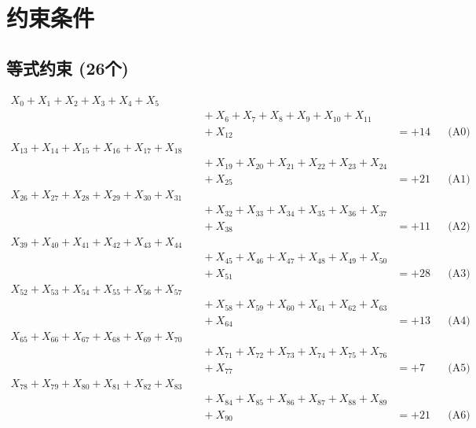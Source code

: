 \documentclass[a4paper,10pt]{article}
\begin{document}
\section{约束条件}

\subsection{等式约束 (26个)}

\allowdisplaybreaks
{\small
\begin{align}
X_{0} + X_{1} + X_{2} + X_{3} + X_{4} + X_{5} \\[0.1ex]
&\quad  + X_{6} + X_{7} + X_{8} + X_{9} + X_{10} + X_{11} \\[0.1ex]
&\quad  + X_{12} &= +14 && \text{(A0)} \\
X_{13} + X_{14} + X_{15} + X_{16} + X_{17} + X_{18} \\[0.1ex]
&\quad  + X_{19} + X_{20} + X_{21} + X_{22} + X_{23} + X_{24} \\[0.1ex]
&\quad  + X_{25} &= +21 && \text{(A1)} \\
X_{26} + X_{27} + X_{28} + X_{29} + X_{30} + X_{31} \\[0.1ex]
&\quad  + X_{32} + X_{33} + X_{34} + X_{35} + X_{36} + X_{37} \\[0.1ex]
&\quad  + X_{38} &= +11 && \text{(A2)} \\
X_{39} + X_{40} + X_{41} + X_{42} + X_{43} + X_{44} \\[0.1ex]
&\quad  + X_{45} + X_{46} + X_{47} + X_{48} + X_{49} + X_{50} \\[0.1ex]
&\quad  + X_{51} &= +28 && \text{(A3)} \\
X_{52} + X_{53} + X_{54} + X_{55} + X_{56} + X_{57} \\[0.1ex]
&\quad  + X_{58} + X_{59} + X_{60} + X_{61} + X_{62} + X_{63} \\[0.1ex]
&\quad  + X_{64} &= +13 && \text{(A4)} \\
\allowbreak
X_{65} + X_{66} + X_{67} + X_{68} + X_{69} + X_{70} \\[0.1ex]
&\quad  + X_{71} + X_{72} + X_{73} + X_{74} + X_{75} + X_{76} \\[0.1ex]
&\quad  + X_{77} &= +7 && \text{(A5)} \\
X_{78} + X_{79} + X_{80} + X_{81} + X_{82} + X_{83} \\[0.1ex]
&\quad  + X_{84} + X_{85} + X_{86} + X_{87} + X_{88} + X_{89} \\[0.1ex]
&\quad  + X_{90} &= +21 && \text{(A6)} \\

\end{align}}
\end{document}
